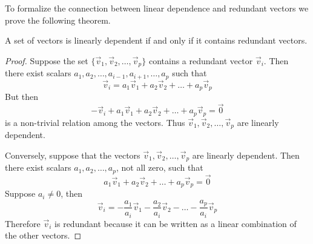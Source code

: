 \documentclass{ximera}
\begin{document}
To formalize the connection between linear dependence and redundant vectors we prove the following theorem.
\begin{theorem}
A set of vectors is linearly dependent if and only if it contains redundant vectors.
\end{theorem}
\begin{proof}
Suppose the set $\{\vec{v}_1,\vec{v}_2,\ldots ,\vec{v}_p\}$ contains a redundant vector $\vec{v}_i$.  Then there exist scalars $a_1, a_2,\ldots, a_{i-1},a_{i+1},\ldots ,a_p$ such that
$$\vec{v}_i=a_1\vec{v}_1+a_2\vec{v}_2+\ldots +a_p\vec{v}_p$$
But then 
$$-\vec{v}_i+a_1\vec{v}_1+a_2\vec{v}_2+\ldots +a_p\vec{v}_p=\vec{0}$$
is a non-trivial relation among the vectors.  Thus $\vec{v}_1,\vec{v}_2,\ldots ,\vec{v}_p$ are linearly dependent.

Conversely, suppose that the vectors $\vec{v}_1,\vec{v}_2,\ldots ,\vec{v}_p$ are linearly dependent.  Then there exist scalars $a_1, a_2, \ldots ,a_p$, not all zero, such that
$$a_1\vec{v}_1+a_2\vec{v}_2+\ldots +a_p\vec{v}_p=\vec{0}$$
Suppose $a_i\neq 0$, then
$$\vec{v}_i=-\frac{a_1}{a_i}\vec{v}_1-\frac{a_2}{a_i}\vec{v}_2-\ldots -\frac{a_p}{a_i}\vec{v}_p$$
Therefore $\vec{v}_i$ is redundant because it can be written as a linear combination of the other vectors.
\end{proof}







\end{document}
